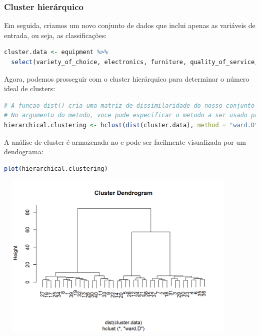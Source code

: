\documentclass{article}
\begin{document}
\subsubsection{Cluster hierárquico}
Em seguida, criamos um novo conjunto de dados que inclui apenas as variáveis de entrada, ou seja, as classificações:

\begin{lstlisting}[language=R]
cluster.data <- equipment %>% 
  select(variety_of_choice, electronics, furniture, quality_of_service, low_prices, return_policy) # Selecione no conjunto de dados do equipamento apenas as variaveis com classificacoes padronizadas
\end{lstlisting}

Agora, podemos prosseguir com o cluster hierárquico para determinar o número ideal de clusters:

\begin{lstlisting}[language=R]
# A funcao dist() cria uma matriz de dissimilaridade do nosso conjunto de dados e deve ser o primeiro argumento para a funcao hclust().
# No argumento do metodo, voce pode especificar o metodo a ser usado para armazenamento em cluster.
hierarchical.clustering <- hclust(dist(cluster.data), method = "ward.D") 
\end{lstlisting}
\newpage

A análise de cluster é armazenada no  e pode ser facilmente visualizada por um dendograma:

\begin{lstlisting}[language=R]
plot(hierarchical.clustering)
\end{lstlisting}



\begin{center}
\includegraphics[width=12cm,height=8cm]{segmentation_hclust_plot-1.png}
\end{center}
\end{document}
